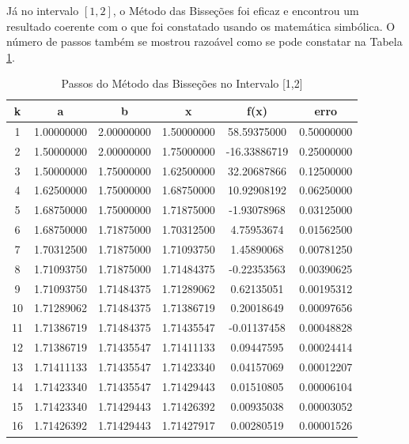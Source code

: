 \documentclass{article}
\begin{document}
Já no intervalo $[1,2]$, o Método das Bisseções foi eficaz e encontrou um resultado coerente com o que foi constatado usando os matemática simbólica. O número de passos também se mostrou razoável como se pode constatar na Tabela \ref{Bissecao1}.


\begin{table}[H]
        \centering
        \vspace{-10pt}
        \caption{Passos do Método das Bisseções no Intervalo [1,2]}
        \label{Bissecao1}
        \begin{tabular}{|c|c| c| c| c |c |}
        \hline \textbf{k} & \textbf{a} & \textbf{b} & \textbf{x} & \textbf{f(x)} & \textbf{erro} \\
        \hline
1  & 1.00000000 & 2.00000000 & 1.50000000 & 58.59375000 & 0.50000000 \\
2  & 1.50000000 & 2.00000000 & 1.75000000 & -16.33886719 & 0.25000000 \\
3  & 1.50000000 & 1.75000000 & 1.62500000 & 32.20687866  & 0.12500000 \\
4  & 1.62500000 & 1.75000000 & 1.68750000 & 10.92908192  & 0.06250000 \\
5  & 1.68750000 & 1.75000000 & 1.71875000 & -1.93078968  & 0.03125000 \\
6  & 1.68750000 & 1.71875000 & 1.70312500 & 4.75953674   & 0.01562500 \\
7  & 1.70312500 & 1.71875000 & 1.71093750 & 1.45890068   & 0.00781250 \\
8  & 1.71093750 & 1.71875000 & 1.71484375 & -0.22353563  & 0.00390625 \\
9  & 1.71093750 & 1.71484375 & 1.71289062 & 0.62135051   & 0.00195312 \\
10 & 1.71289062 & 1.71484375 & 1.71386719 & 0.20018649   & 0.00097656 \\
11 & 1.71386719 & 1.71484375 & 1.71435547 & -0.01137458  & 0.00048828 \\
12 & 1.71386719 & 1.71435547 & 1.71411133 & 0.09447595   & 0.00024414 \\
13 & 1.71411133 & 1.71435547 & 1.71423340 & 0.04157069   & 0.00012207 \\
14 & 1.71423340 & 1.71435547 & 1.71429443 & 0.01510805   & 0.00006104 \\
15 & 1.71423340 & 1.71429443 & 1.71426392 & 0.00935038   & 0.00003052 \\
16 & 1.71426392 & 1.71429443 & 1.71427917 & 0.00280519   & 0.00001526 \\
        \hline
    \end{tabular}
    \end{table}
\end{document}
